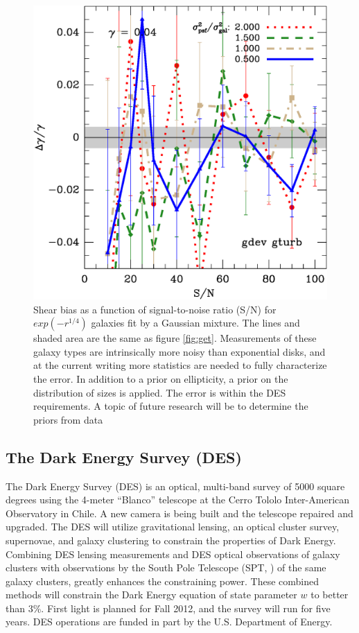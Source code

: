 \documentclass[12pt]{article}
\newcommand{\commissdate}{Fall 2012}
\begin{document}
\begin{figure}[p]
\centering

\includegraphics[scale=0.4]{mcbayes-gdt02r11-yr-0.050-0.050-frac.eps}
\caption{Shear bias as a function of signal-to-noise ratio (S/N) for
$exp(-r^{1/4})$ galaxies fit by a Gaussian mixture.  The lines and shaded area
are the same as figure \ref{fig:get}. Measurements of these galaxy types are
intrinsically more noisy than exponential disks, and at the current writing
more statistics are needed to fully characterize the error.  In addition to a
prior on ellipticity, a prior on the distribution of sizes is applied. The
error is within the DES requirements.  A topic of future research will be to
determine the priors from data \label{fig:gdt}}


\end{figure}

\subsection{The Dark Energy Survey (DES)}

The Dark Energy Survey (DES) is an optical, multi-band survey of 5000 square
degrees using the 4-meter ``Blanco'' telescope at the Cerro Tololo
Inter-American Observatory in Chile. A new camera is being built and the
telescope repaired and upgraded.  The DES will utilize gravitational lensing,
an optical cluster survey, supernovae, and galaxy clustering to constrain the
properties of Dark Energy.  Combining DES lensing measurements and DES optical
observations of galaxy clusters with observations by the South Pole Telescope
(SPT, \cite{SPT04}) of the same galaxy clusters, greatly enhances the
constraining power.  These combined methods will constrain the Dark Energy
equation of state parameter $w$ to better than 3\%.  First light is planned for
\commissdate, and the survey will run for five years.  DES operations are
funded in part by the U.S.  Department of Energy. 
\end{document}
